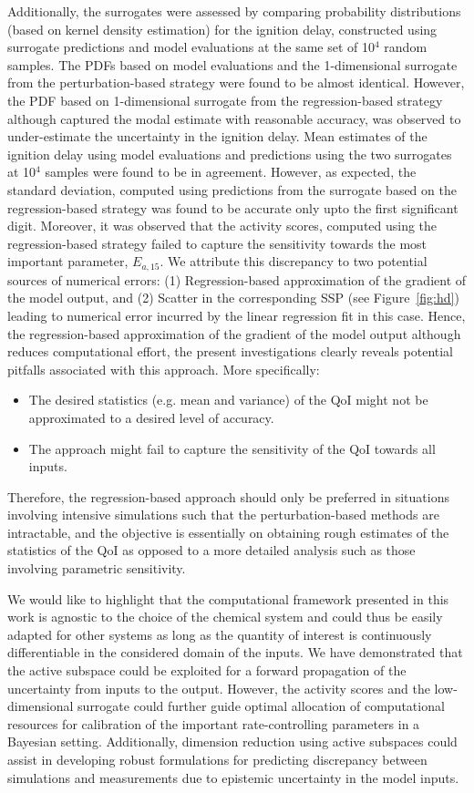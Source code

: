 Additionally, the surrogates were assessed by comparing probability distributions (based on kernel density estimation)
for the ignition delay, constructed using surrogate predictions and model evaluations at the same set of 10$^4$
random samples. The PDFs based on model evaluations and the 1-dimensional surrogate from the perturbation-based
strategy were found to be almost identical. However, the PDF based on 1-dimensional surrogate from the
regression-based strategy although captured the modal estimate with reasonable accuracy, was observed to
under-estimate the uncertainty in the ignition delay. Mean estimates of the ignition delay using model evaluations
and predictions using the two surrogates at 10$^4$ samples were found to be in agreement. However, as expected, the
standard deviation, computed using predictions from the surrogate based on the regression-based strategy was
found to be accurate only upto the first significant digit. Moreover, it was observed that the activity scores,
computed using the regression-based strategy failed to capture the sensitivity towards the 
most important parameter, $E_{a,15}$. 
We attribute this discrepancy to two potential sources of numerical errors: (1) Regression-based approximation of the
gradient of the model output, and (2) Scatter in the corresponding SSP (see Figure~\ref{fig:hd}) leading to numerical
error incurred by the linear regression fit in this case. Hence, the regression-based approximation of the gradient 
of the model output although reduces computational effort, the present investigations clearly 
reveals potential pitfalls associated with this approach. More specifically:
\begin{itemize}
\item The desired statistics (e.g. mean and variance) of the QoI might not be approximated
to a desired level of accuracy.
\item The approach might fail to capture the sensitivity  of the QoI towards all inputs. 
\end{itemize}
Therefore, the regression-based approach should only be preferred in situations involving intensive simulations such that the perturbation-based methods are intractable, and the objective is
essentially on obtaining rough estimates of the statistics of the QoI as opposed to a more detailed analysis such as those involving
parametric sensitivity. 
 
 We would like to highlight that the computational framework presented in this work is agnostic to the choice
 of the chemical system and could thus be easily adapted for other systems as long as the quantity of interest
is continuously differentiable in the considered domain of the inputs.
We have demonstrated that the active subspace could be exploited for a forward propagation of
 the uncertainty from inputs to the output. However, the activity scores and the low-dimensional surrogate could further guide optimal allocation of computational resources for  
 calibration of the important rate-controlling parameters in a Bayesian setting. 
Additionally, dimension reduction using active subspaces could assist in developing robust formulations
for predicting discrepancy between simulations and measurements due to epistemic uncertainty in the model inputs.
